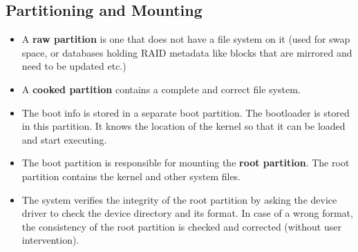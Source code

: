 \documentclass{article}
\theoremstyle{plain}
\theoremstyle{definition}
\begin{document}
\subsection{Partitioning and Mounting}
\begin{itemize}
    \item A \textbf{raw partition} is one that does not have a file system on it (used for swap space, or databases holding RAID metadata like blocks that are mirrored and need to be updated etc.)
    
    \item A \textbf{cooked partition} contains a complete and correct file system. 
    
    \item The boot info is stored in a separate boot partition. The bootloader is stored in this partition. It knows the location of the kernel so that it can be loaded and start executing. 
    
    \item The boot partition is responsible for mounting the \textbf{root partition}. The root partition contains the kernel and other system files.
    
    \item The system verifies the integrity of the root partition by asking the device driver to check the device directory and its format. In case of a wrong format, the consistency of the root partition is checked and corrected (without user intervention). 
\end{itemize}
\end{document}
